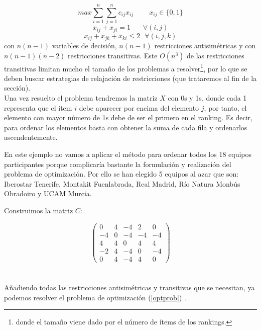 \begin{equation} \label{optprob}
	max \sum_{i=1}^{n} \sum_{j=1}^{n} c_{ij} x_{ij} \ \ \ \ \ \ \ \ \ \ x_{ij} \in \{0,1\} 
\end{equation}
\begin{equation*}
	x_{ij} + x_{ji} = 1 \ \ \ \ \ \ \ \ \forall (i,j)
\end{equation*}
\begin{equation*}
	x_{ij} + x_{jk} + x_{ki} \leq 2 \ \ \ \forall (i,j,k)
\end{equation*}
con $n(n-1)$ variables de decisión, $n(n-1)$ restricciones antisimétricas y con $n(n-1)(n-2)$ restricciones transitivas. Este $O(n^{3})$ de las restricciones transitivas limitan mucho el tamaño de los problemas a resolver\footnote{donde el tamaño viene dado por el número de ítems de los rankings.}, por lo que se deben buscar estrategias de relajación de restricciones (que trataremos al fin de la sección).\\

Una vez resuelto el problema tendremos la matriz $X$ con 0s y 1s, donde cada 1 representa que el item $i$ debe aparecer por encima del elemento $j$, por tanto, el elemento con mayor número de 1s debe de ser el primero en el ranking. Es decir, para ordenar los elementos basta con obtener la suma de cada fila y ordenarlos ascendentemente.\\   
 
\begin{ejem} En este ejemplo no vamos a aplicar el método para ordenar todos los 18 equipos participantes porque complicaría bastante la formulación y realización del problema de optimización. Por ello se han elegido 5 equipos al azar que son: Iberostar Tenerife, Montakit Fuenlabrada, Real Madrid, Río Natura Monbús Obradoiro y UCAM Murcia.
\end{ejem}	
Construimos la matriz $C$:

\[	
	\left( \begin{array}{ccccc}
		0 & 4 & -4 & 2 & 0\\
		-4 & 0 & -4 & -4 & -4\\
		4 & 4 & 0 & 4 & 4\\
		-2 & 4 & -4 & 0 & -4\\
		0 & 4 & -4 & 4 & 0
	\end{array} \right) 
\]	
\ \\  \ \\
Añadiendo todas las restricciones antisimétricas y transitivas que se necesitan, ya podemos resolver el problema de optimización (\ref{optprob}) .\\

